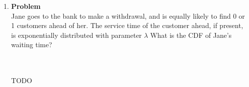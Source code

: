 \documentclass[12pt]{article}
\newenvironment{Ex}{\textbf{Problem}\vspace{.75em}\\}{}
\begin{document}
\begin{enumerate}
\begin{Ex}
\begin{enumerate}
    \item Suppose $Z$ has CDF $F_Z(z)$ described in
      \cref{fig:6-fig}. Find $F_X$ discrete, $F_Y$ continuous, and
      $\alpha$ for $Z$.
      \begin{figure}[h]
        \centering
        \caption{$F_Z(z)$}
        \label{fig:6-fig}
      \end{figure}
    \end{enumerate}
    \begin{solution} \hfill \\\\ {\huge TODO}
    \end{solution}
  \end{Ex}
\item
  \begin{Ex}
    Jane goes to the bank to make a withdrawal, and is equally likely
    to find 0 or 1 customers ahead of her. The service time of the
    customer ahead, if present, is exponentially distributed with
    parameter $\lambda$ What is the CDF of Jane’s waiting time?
    \begin{solution} \hfill \\\\ {\huge TODO}
    \end{solution}
  \end{Ex}

\end{enumerate}
\end{document}
